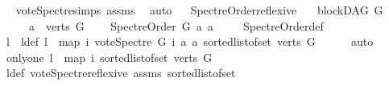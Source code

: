 \begin{isabellebody}
\isadelimproof
\ %
\endisadelimproof
%
\isatagproof
{}\isamarkupfalse%
\ vote{\isacharunderscore}{\kern0pt}Spectre{\isachardot}{\kern0pt}simps\ assms\ \isamarkupfalse%
\ auto%
\endisatagproof
{\isafoldproof}%
%
\isadelimproof
%
\endisadelimproof
\ \isanewline
\isanewline
{}\isamarkupfalse%
\ Spectre{\isacharunderscore}{\kern0pt}Order{\isacharunderscore}{\kern0pt}reflexive{\isacharcolon}{\kern0pt}\isanewline
\ \ \ {\isachardoublequoteopen}blockDAG\ G{\isachardoublequoteclose}\isanewline
\ \ \ \ \ {\isachardoublequoteopen}a\ {\isasymin}\ verts\ G{\isachardoublequoteclose}\ \isanewline
\ \ \ {\isachardoublequoteopen}Spectre{\isacharunderscore}{\kern0pt}Order\ G\ a\ a{\isachardoublequoteclose}\ \isanewline
%
\isadelimproof
\ \ %
\endisadelimproof
%
\isatagproof
{}\isamarkupfalse%
\ Spectre{\isacharunderscore}{\kern0pt}Order{\isacharunderscore}{\kern0pt}def\ \isanewline
{}\isamarkupfalse%
\ {\isacharminus}{\kern0pt}\ \ \ \isanewline
\ \ \isamarkupfalse%
\ l\ \ l{\isacharunderscore}{\kern0pt}def{\isacharcolon}{\kern0pt}\ {\isachardoublequoteopen}l\ {\isacharequal}{\kern0pt}\ {\isacharparenleft}{\kern0pt}map\ {\isacharparenleft}{\kern0pt}{\isasymlambda}i{\isachardot}{\kern0pt}\ vote{\isacharunderscore}{\kern0pt}Spectre\ G\ i\ a\ a{\isacharparenright}{\kern0pt}\ {\isacharparenleft}{\kern0pt}sorted{\isacharunderscore}{\kern0pt}list{\isacharunderscore}{\kern0pt}of{\isacharunderscore}{\kern0pt}set\ {\isacharparenleft}{\kern0pt}verts\ G{\isacharparenright}{\kern0pt}{\isacharparenright}{\kern0pt}{\isacharparenright}{\kern0pt}{\isachardoublequoteclose}\isanewline
\ \ \ \ \isamarkupfalse%
\ auto\isanewline
\ \ \isamarkupfalse%
\ only{\isacharunderscore}{\kern0pt}one{\isacharcolon}{\kern0pt}\ {\isachardoublequoteopen}l\ {\isacharequal}{\kern0pt}\ {\isacharparenleft}{\kern0pt}map\ {\isacharparenleft}{\kern0pt}{\isasymlambda}i{\isachardot}{\kern0pt}{}{\isacharparenright}{\kern0pt}\ {\isacharparenleft}{\kern0pt}sorted{\isacharunderscore}{\kern0pt}list{\isacharunderscore}{\kern0pt}of{\isacharunderscore}{\kern0pt}set\ {\isacharparenleft}{\kern0pt}verts\ G{\isacharparenright}{\kern0pt}{\isacharparenright}{\kern0pt}{\isacharparenright}{\kern0pt}{\isachardoublequoteclose}\isanewline
\ \ \ \ \isamarkupfalse%
\ l{\isacharunderscore}{\kern0pt}def\ vote{\isacharunderscore}{\kern0pt}Spectre{\isacharunderscore}{\kern0pt}reflexive\ assms\ sorted{\isacharunderscore}{\kern0pt}list{\isacharunderscore}{\kern0pt}of{\isacharunderscore}{\kern0pt}set{\isacharparenleft}{\kern0pt}{}{\isacharparenright}{\kern0pt}\isanewline

\end{isabellebody}
